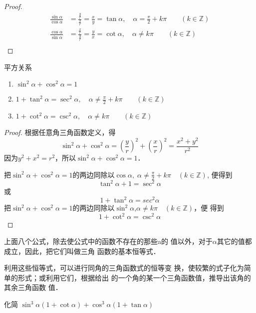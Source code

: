 \begin{proof}
\[\begin{split}
    \frac{\sin\alpha}{\cos\alpha}&=\frac{\frac{y}{r}}{\frac{x}{r}}=\frac{x}{y}=\tan\alpha,\quad \alpha=\frac{\pi}{2}+k\pi\qquad (k\in\mathbb{Z})\\
    \frac{\cos\alpha}{\sin\alpha}&=\frac{\frac{x}{r}}{\frac{y}{r}}=\frac{y}{x}=\cot\alpha,\quad \alpha\ne k\pi\qquad (k\in\mathbb{Z})\\
\end{split}\]    
\end{proof}


\begin{blk}{平方关系}
\begin{enumerate}
    \item $\sin^2\alpha+\cos^2\alpha=1$
    \item $1+\tan^2\alpha=\sec^2\alpha,\quad \alpha\ne \frac{\pi}{2}+k\pi\qquad  (k\in\mathbb{Z})$
    \item $1+\cot^2\alpha=\csc^2\alpha,\quad \alpha\ne k\pi \qquad (k\in\mathbb{Z})$
\end{enumerate}
\end{blk}

\begin{proof}
    根据任意角三角函数定义，得
\[\sin^2\alpha+\cos^2\alpha=\left(\frac{y}{r}\right)^2+\left(\frac{x}{r}\right)^2=\frac{x^2+y^2}{r^2}\]
因为$y^2+x^2=r^2$，所以$\sin^2\alpha+\cos^2\alpha=1$．

把$\sin^2\alpha+\cos^2\alpha=1$的两边同除以$\cos\alpha,\; \alpha\ne\frac{\pi}{2}+k\pi\quad (k\in\mathbb{Z})$, 便得到
\[\tan^2\alpha+1=\sec^2\alpha\]
或
\[1+\tan^2\alpha=sec^2\alpha\]
把$\sin^2\alpha+\cos^2\alpha=1$的两边同除以$\sin^2\alpha$,$\alpha\ne k\pi\quad (k\in\mathbb{Z})$，便
得到
\[1+\cot^2\alpha =\csc^2\alpha\]
\end{proof}


上面八个公式，除去使公式中的函数不存在的那些a的
值以外，对于$\alpha$其它的值都成立，因此，把它们叫做三角
函数的基本恒等式．

利用这些恒等式，可以进行同角的三角函数式的恒等变
换，使较繁的式子化为简单的形式；或利用它们，根据给出
的一个角的某一个三角函数值，推导出该角的其余三角函数
值．




\begin{example}
    化简 $\sin ^{3} \alpha(1+\cot \alpha)+\cos ^{3} \alpha(1+\tan \alpha)$
\end{example}

